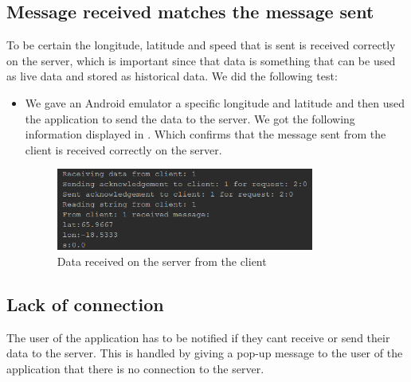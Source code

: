 \subsection{Message received matches the message sent}
To be certain the longitude, latitude and speed that is sent is received correctly on the server, which is important since that data is something that can be used as live data and stored as historical data. We did the following test:
\begin{itemize}
	\item We gave an Android emulator a specific longitude and latitude and then used the application to send the data to the server. We got the following information displayed in . Which confirms that the message sent from the client is received correctly on the server.
	\begin{figure}[h!]
  \centering
    \includegraphics[width=0.8\textwidth]{figures/datasentfromclienttoserver.png}
    \caption{Data received on the server from the client}
    \label{fig:datasentfromclienttoserver}
\end{figure}
\end{itemize}


\subsection{Lack of connection}
The user of the application has to be notified if they cant receive or send their data to the server. This is handled by giving a pop-up message to the user of the application that there is no connection to the server.


